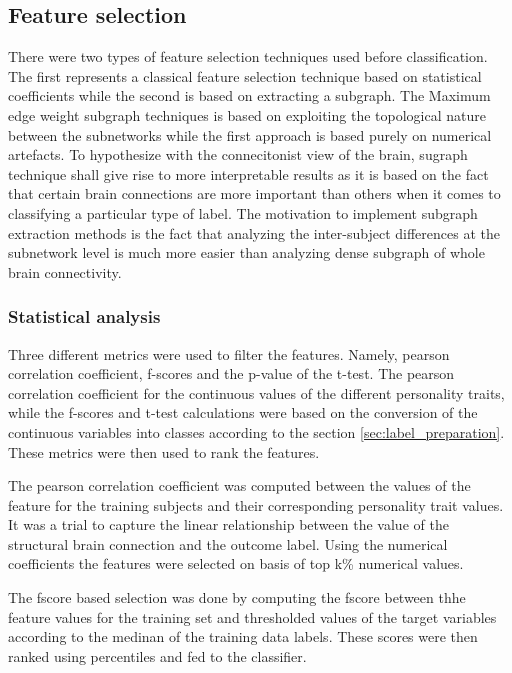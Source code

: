 \documentclass[msthesis.tex]{subfiles}
\begin{document}
\subsection{Feature selection} 
There were two types of feature selection techniques used before classification. The first represents a classical feature selection technique based on statistical coefficients while the second is based on extracting a subgraph. The Maximum edge weight subgraph techniques is based on exploiting the topological nature between the subnetworks while the first approach is based purely on numerical artefacts. To hypothesize with the connecitonist view of the brain, sugraph technique shall give rise to more interpretable results as it is based on the fact that certain brain connections are more important than others when it comes to classifying a particular type of label. The motivation to implement subgraph extraction methods is the fact that analyzing the inter-subject differences at the subnetwork level is much more easier than analyzing dense subgraph of whole brain connectivity. 

\subsubsection{Statistical analysis}
Three different metrics were used to filter the features. Namely, pearson correlation coefficient, f-scores and the p-value of the t-test. The pearson correlation coefficient for the continuous values of the different personality traits, while the f-scores and t-test calculations were based on the conversion of the continuous variables into classes according to the section \ref{sec:label_preparation}. These metrics were then used to rank the features.

The pearson correlation coefficient was computed between the values of the feature for the training subjects and their corresponding personality trait values. It was a trial to capture the linear relationship between the value of the structural brain connection and the outcome label. Using the numerical coefficients the features were selected on basis of top k\% numerical values.

The fscore based selection was done by computing the fscore between thhe feature values for the training set and thresholded values of the target variables according to the medinan of the training data labels. These scores were then ranked using percentiles and fed to the classifier. 
\end{document}
